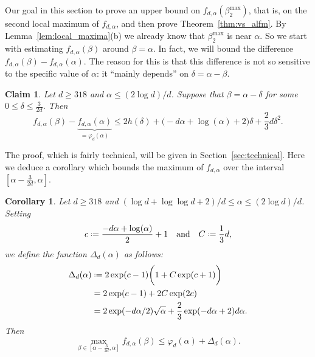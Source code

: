 \documentclass[12pt]{amsart}
\newtheorem{corollary}[theorem]{Corollary}
\newtheorem{claim}[theorem]{Claim}
\theoremstyle{definition}
\newcommand\al{\alpha}
\newcommand\be{\beta}
\newcommand\de{\delta}
\newcommand\De{\Delta}
\newcommand{\defeq}{\mathrel{\vcenter{\baselineskip0.5ex \lineskiplimit0pt
                     \hbox{\scriptsize.}\hbox{\scriptsize.}}}%
                     =}
\begin{document}
\newcommand\Coefd{\frac{2}{3}}
\newcommand\Coef{\frac{1}{3}}

Our goal in this section to prove an upper bound on $f_{d,\al}(\be_2^{\max})$, that is, on the second local maximum of $f_{d,\al}$, and then prove Theorem~\ref{thm:vs_alfm}. By Lemma~\ref{lem:local_maxima}(b) we already know that $\be_2^{\max}$ is near $\al$. So we start with estimating $f_{d,\al}(\be)$ around $\be=\al$. In fact, we will bound the difference $f_{d,\al}(\be) -f_{d,\al}(\al)$. The reason for this is that this difference is not so sensitive to the specific value of $\al$: it ``mainly depends'' on $\de = \al-\be$.
%
\begin{claim} \label{cl:f_diff}
Let $d \geq 318$ and $\al \leq (2\log d)/d$. Suppose that $\be=\al-\de$ for some $0\leq \de \leq \frac{3}{2d}$. Then 
%
\begin{equation*}
f_{d,\al}(\be) - \underbrace{f_{d,\al}(\al)}_{=\varphi_d(\al)} 
\leq 2 h(\de) 
+ \big( -d\al + \log(\al) + 2 \big) \de 
+ \Coefd d \de^2 .
\end{equation*}
%
\end{claim}
%
The proof, which is fairly technical, will be given in Section~\ref{sec:technical}. Here we deduce a corollary which bounds the maximum of $f_{d,\al}$ over the interval $[\al-\frac{3}{2d},\al]$. %
%
\begin{corollary} \label{cor:max_diff}
Let $d \geq 318$ and $(\log d + \log\log d + 2)/d \leq \al \leq (2\log d)/d$. Setting
%
\begin{equation}
c \defeq \frac{-d\al + \log(\al)}{2}+1 
\quad \text{and} \quad
C \defeq \Coef d,
\label{eq:cC}
\end{equation}
%
we define the function $\De_{d}(\al)$ as follows:
%
\begin{align}
\begin{split}
\De_{d}(\al) 
& \defeq 2\exp(c-1) \bigg( 1+ C \exp(c+1) \bigg) \\
&= 2\exp(c-1)+2C\exp(2c) \\
&= 2 \exp(-d\al/2) \sqrt{\al} 
+ \Coefd \exp(-d\al+2) d\al . 
\label{eq:Delta}
\end{split}    
\end{align}
%
Then 
%
\begin{equation*}
\max_{\be \in [\al-\frac{3}{2d},\al]} f_{d,\al}(\be) 
\leq \varphi_d(\al) + \De_{d}(\al) .
\end{equation*}
%
\end{corollary}
\end{document}
